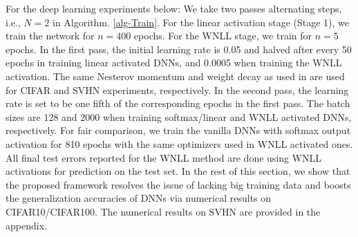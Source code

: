 \documentclass{article}
\begin{document}
For the deep learning experiments below: We take two passes alternating steps, i.e., $N=2$ in Algorithm. \ref{alg-Train}. For the linear activation stage (Stage 1), we train the network for $n=400$ epochs. For the WNLL stage, we train for $n=5$ epochs. In the first pass, the initial learning rate is 0.05 and halved after every 50 epochs in training linear activated DNNs, and 0.0005 when training the WNLL activation. The same Nesterov momentum and weight decay as used in \cite{ResNet,Huang:2016ECCV} are used for CIFAR and SVHN experiments, respectively. In the second pass, the learning rate is set to be one fifth of the corresponding epochs in the first pass. The batch sizes are 128 and 2000 when training softmax/linear and WNLL activated DNNs, respectively. For fair comparison, we train the vanilla DNNs with softmax output activation for 810 epochs with the same optimizers used in WNLL activated ones. All final test errors reported for the WNLL method are done using WNLL activations for prediction on  the test set. In the rest of this section, we show that the proposed framework resolves the issue of lacking big training data and boosts the generalization accuracies of DNNs via numerical results on CIFAR10/CIFAR100. The numerical results on SVHN are provided in the appendix.




\end{document}
